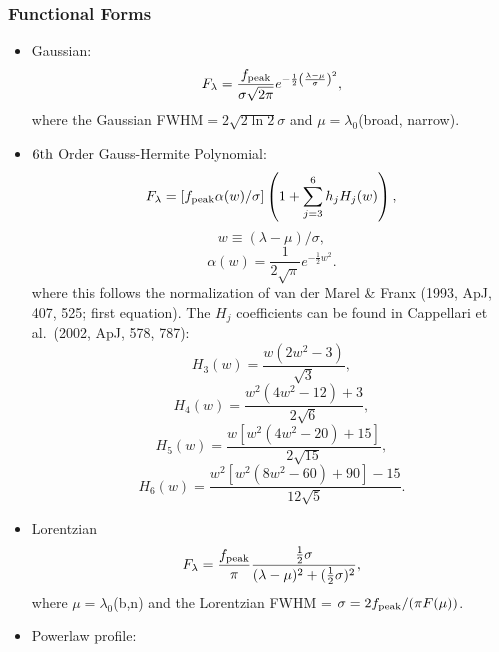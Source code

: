 \documentclass[12pt,letterpaper]{article}
\begin{document}
\subsubsection*{Functional Forms}
  \begin{itemize}
    \item Gaussian:
      \begin{equation} F_{\lambda} = \frac{f_{\rm peak}}{\sigma \sqrt{2\pi}}e^{-\frac{1}{2}\left(\frac{\lambda - \mu}{\sigma}\right)^2},
        \end{equation}
        where the Gaussian FWHM$=2\sqrt{2\ln 2}\sigma$ and $\mu=\lambda_0$(broad, narrow).\\

     \item $6{\rm th}$ Order Gauss-Hermite Polynomial:
       \begin{equation} F_{\lambda} = [f_{\rm peak} \alpha(w)/\sigma]\left(1 + \sum_{j=3}^{6}h_jH_j(w) \right), 
       \end{equation} 
       \begin{equation} w\equiv (\lambda - \mu)/\sigma,
       \end{equation}
       \begin{equation} \alpha(w) = \frac{1}{2\sqrt{\pi}} e^{-\frac{1}{2}w^2}. \end{equation}
       where this follows the normalization of van der Marel \& Franx (1993, ApJ, 407, 525; first equation).  The $H_j$ coefficients can be found in Cappellari et al.\ (2002, ApJ, 578, 787):
       \begin{equation} H_3(w) = \frac{w(2w^2-3)}{\sqrt{3}}, \end{equation}
       \begin{equation} H_4(w) = \frac{w^2(4w^2-12)+3}{2\sqrt{6}}, \end{equation}
       \begin{equation} H_5(w) = \frac{w[w^2(4w^2-20)+15]}{2\sqrt{15}}, \end{equation}
       \begin{equation} H_6(w) = \frac{w^2[w^2(8w^2-60)+90]-15}{12\sqrt{5}}. \end{equation}

     \item Lorentzian
       \begin{equation} F_{\lambda} = \frac{f_{\rm peak}}{\pi} \frac{\frac{1}{2}\sigma}{(\lambda - \mu)^2+(\frac{1}{2}\sigma)^2},
       \end{equation}
       where $\mu=\lambda_0$(b,n) and the Lorentzian FWHM = $\sigma = 2f_{\rm peak}/(\pi F(\mu))$.

     \item Powerlaw profile:
  \end{itemize}
\end{document}
